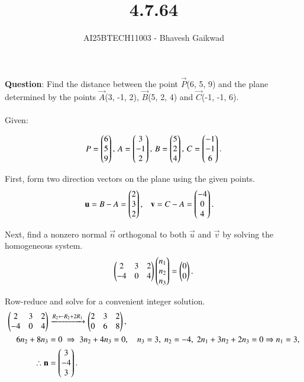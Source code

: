 \documentclass[journal]{IEEEtran}
\begin{document}

\vspace{3cm}

\title{4.7.64}
\author{AI25BTECH11003 - Bhavesh Gaikwad}
{\let\newpage\relax\maketitle}

\renewcommand{\thefigure}{\theenumi}
\renewcommand{\thetable}{\theenumi}
\setlength{\intextsep}{10pt} 


\renewcommand{\thetable}{\theenumi}


\textbf{Question}: Find the distance between the point $\vec{P}$(6, 5, 9) and the plane determined by the points $\vec{A}$(3, -1, 2), $\vec{B}$(5, 2, 4) and $\vec{C}$(-1, -1, 6). \\


\solution
\\Given:

\begin{align}
P = \begin{pmatrix}6\\5\\9\end{pmatrix}, \,
A = \begin{pmatrix}3\\-1\\2\end{pmatrix}, \,
B = \begin{pmatrix}5\\2\\4\end{pmatrix}, \,
C = \begin{pmatrix}-1\\-1\\6\end{pmatrix}.
\end{align}

First, form two direction vectors on the plane using the given points.
\begin{align}
\mathbf{u} &= B - A = \begin{pmatrix}2\\3\\2\end{pmatrix}, &
\mathbf{v} &= C - A = \begin{pmatrix}-4\\0\\4\end{pmatrix}.
\end{align}

Next, find a nonzero normal $\vec{n}$ orthogonal to both $\vec{u}$ and $\vec{v}$ by solving the homogeneous system.
\begin{equation}
\begin{pmatrix}2 & 3 & 2\\ -4 & 0 & 4\end{pmatrix}\begin{pmatrix}n_1\\n_2\\n_3\end{pmatrix}=\begin{pmatrix}0\\0\end{pmatrix}.
\end{equation}

Row-reduce and solve for a convenient integer solution.
\begin{align}
\begin{pmatrix}2 & 3 & 2\\ -4 & 0 & 4\end{pmatrix}
&\xrightarrow{R_2\leftarrow R_2+2R_1}
\begin{pmatrix}2 & 3 & 2\\ 0 & 6 & 8\end{pmatrix},\\
6n_2+8n_3&=0 \;\Rightarrow\; 3n_2+4n_3=0, \quad
n_3=3,\; n_2=-4,\; 2n_1+3n_2+2n_3=0 \Rightarrow n_1=3,\\
\therefore \mathbf{n} &= \begin{pmatrix}3\\-4\\3\end{pmatrix}.
\end{align}
\end{document}
